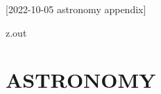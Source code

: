 [2022-10-05 astronomy appendix]

\begin{VerbatimOut}{z.out}
\chapter{ASTRONOMY}


\end{VerbatimOut}

\MyIO
